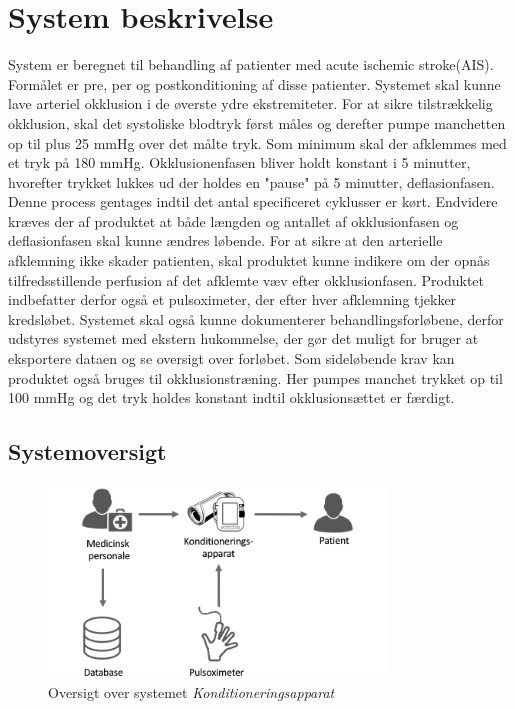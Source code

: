 \chapter{System beskrivelse}
System er beregnet til behandling af patienter med acute ischemic stroke(AIS). Formålet er pre, per og postkonditioning af disse patienter. Systemet skal kunne lave arteriel okklusion i de øverste ydre ekstremiteter. For at sikre tilstrækkelig okklusion, skal det systoliske blodtryk først måles og derefter pumpe manchetten op til plus 25 mmHg over det målte tryk. Som minimum skal der afklemmes med et tryk på 180 mmHg. Okklusionenfasen  bliver holdt konstant i 5 minutter, hvorefter trykket lukkes ud der holdes en "pause" på 5 minutter, deflasionfasen. Denne process gentages indtil det antal specificeret cyklusser er kørt. Endvidere kræves der af produktet at både længden og antallet af okklusionfasen og deflasionfasen skal kunne ændres løbende. 
For at sikre at den arterielle afklemning ikke skader patienten, skal produktet kunne indikere om der opnås tilfredsstillende perfusion af det afklemte væv efter okklusionfasen. Produktet indbefatter derfor også et pulsoximeter, der efter hver afklemning tjekker kredsløbet. Systemet skal også kunne dokumenterer behandlingsforløbene, derfor udstyres systemet med ekstern hukommelse, der gør det muligt for bruger at eksportere dataen og se oversigt over forløbet. 
Som sideløbende krav kan produktet også bruges til okklusionstræning. Her pumpes manchet trykket op til 100 mmHg og det tryk holdes konstant indtil okklusionsættet er færdigt.  

\section{Systemoversigt}
\begin{figure}[H]
	\includegraphics[width=0.8\textwidth]{Kravspecifikation/Illustrationer/saelgertegning.png}
	\caption{Oversigt over systemet \textit{Konditioneringsapparat}}
\end{figure}
